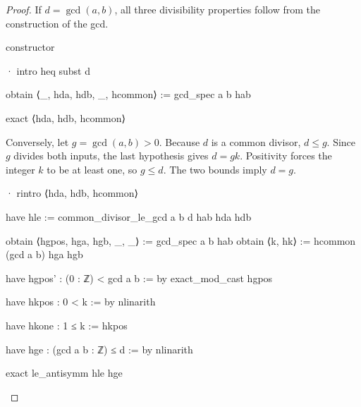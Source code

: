 \begin{proof}
  If $d=\gcd(a,b)$, all three divisibility properties follow from the construction of the gcd.

  \begin{lean}
    constructor

    · intro heq
      subst d

      obtain ⟨_, hda, hdb, _, hcommon⟩ := gcd_spec a b hab

      exact ⟨hda, hdb, hcommon⟩
  \end{lean}
  Conversely, let $g=\gcd(a,b)>0$.
  Because $d$ is a common divisor, $d\le g$.
  Since $g$ divides both inputs, the last hypothesis gives $d=gk$.
  Positivity forces the integer $k$ to be at least one, so $g\le d$.
  The two bounds imply $d=g$.

  \begin{lean}
    · rintro ⟨hda, hdb, hcommon⟩

      have hle := common_divisor_le_gcd a b d hab hda hdb

      obtain ⟨hgpos, hga, hgb, _, _⟩ := gcd_spec a b hab
      obtain ⟨k, hk⟩ := hcommon (gcd a b) hga hgb

      have hgpos' : (0 : ℤ) < gcd a b := by
        exact_mod_cast hgpos

      have hkpos : 0 < k := by
        nlinarith

      have hkone : 1 ≤ k := hkpos

      have hge : (gcd a b : ℤ) ≤ d := by
        nlinarith

      exact le_antisymm hle hge
  \end{lean}
\end{proof}
